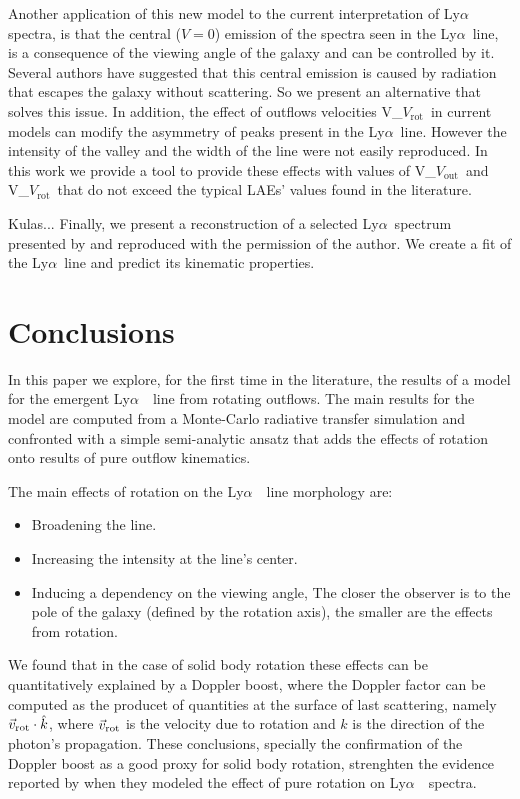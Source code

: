 \documentclass[a4paper,fleqn,usenatbib]{mnras}
\newcommand{\lya}{\ifmmode{{\rm Ly}\alpha}\else Ly$\alpha$\ \fi}
\newcommand{\vrot}{\ifmmode\mathrm V_{\mathrm{rot}}\else $V_{\mathrm{rot}}$~\fi}
\newcommand{\vout}{\ifmmode\mathrm V_{\mathrm{out}}\else $V_{\mathrm{out}}$~\fi}
\begin{document}
Another application of this new model to the current interpretation of \lya
spectra, is that the central ($V=0$) emission of the spectra seen in the
\lya line, is a consequence of the viewing angle of the galaxy and can be
controlled by it. Several authors have suggested that this central emission
is caused by radiation that escapes the galaxy without scattering. So we
present an alternative that solves this issue. In addition, the effect of
outflows velocities \vrot in current models can modify the asymmetry of peaks
present in the \lya line. However the intensity of the valley and the width
of the line were not easily reproduced. In this work we provide a tool to
provide these effects with values of \vout and \vrot that do not exceed the
typical LAEs' values found in the literature.

\color{red}
Kulas...
\color{black}
Finally, we present a reconstruction of a selected \lya spectrum presented
by \cite{Kulas12} and reproduced with the permission of the author. We create
a fit of the \lya line and predict its kinematic properties.

\section{Conclusions}
\label{sec:conclusions}

In this paper we explore, for the first time in the literature,
the results of a model for the emergent \lya\ line from rotating outflows.
The main results for the model are computed from a Monte-Carlo radiative transfer
simulation and confronted with a simple semi-analytic ansatz that adds the effects
of rotation onto results of pure outflow kinematics.

The main effects of rotation on the \lya\ line morphology are:


\begin{itemize}
  \item Broadening the line.
	\item Increasing the intensity at the line's center.
	\item Inducing a dependency on the viewing angle,
  The closer the observer is to the pole of the galaxy (defined by the rotation axis),
  the smaller are the effects from rotation.
\end{itemize}

We found that in the case of solid body rotation these effects can be quantitatively
explained by a Doppler boost, where the Doppler factor can be computed as the
 producet of quantities at the surface of last scattering, namely $\vec{v}_{\rm rot}\cdot \hat{k}$,
 where $\vec{v}_{\rm rot}$ is the velocity due to rotation and $\hat{k}$ is the direction
of the photon's propagation.
These conclusions, specially the confirmation of the Doppler boost as
a good proxy for solid body rotation, strenghten the evidence reported
by \cite{Garavito14} when they modeled the effect of pure rotation on
\lya\ spectra.  
\end{document}
